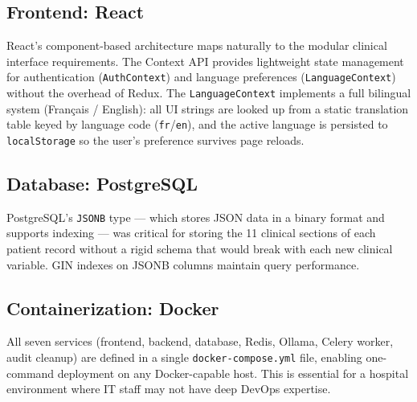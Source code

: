 \documentclass[12pt,a4paper,twoside]{report}
\begin{document}
\subsection{Frontend: React}

React's component-based architecture maps naturally to the modular clinical interface requirements. The Context API provides lightweight state management for authentication (\texttt{AuthContext}) and language preferences (\texttt{LanguageContext}) without the overhead of Redux. The \texttt{LanguageContext} implements a full bilingual system (Français / English): all UI strings are looked up from a static translation table keyed by language code (\texttt{fr}/\texttt{en}), and the active language is persisted to \texttt{localStorage} so the user's preference survives page reloads.

\subsection{Database: PostgreSQL}

PostgreSQL's \texttt{JSONB} type — which stores JSON data in a binary format and supports indexing — was critical for storing the 11 clinical sections of each patient record without a rigid schema that would break with each new clinical variable. GIN indexes on JSONB columns maintain query performance.

\subsection{Containerization: Docker}

All seven services (frontend, backend, database, Redis, Ollama, Celery worker, audit cleanup) are defined in a single \texttt{docker-compose.yml} file, enabling one-command deployment on any Docker-capable host. This is essential for a hospital environment where IT staff may not have deep DevOps expertise.
\end{document}

